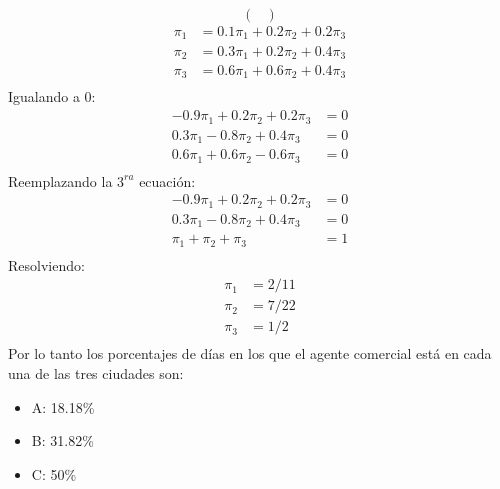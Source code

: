 \documentclass{templateNote}
\begin{document}
\begin{enumerate}
\begin{enumerate}[label=\alph*)]
\begin{equation*}
\begin{pmatrix}
            \end{pmatrix}
        \end{equation*}
        \begin{align*}
            \pi_1 &= 0.1\pi_1 + 0.2\pi_2 + 0.2\pi_3\\
            \pi_2 &= 0.3\pi_1 + 0.2\pi_2 + 0.4\pi_3\\
            \pi_3 &= 0.6\pi_1 + 0.6\pi_2 + 0.4\pi_3\\
        \end{align*}
        Igualando a 0:
        \begin{align*}
            -0.9\pi_1 + 0.2\pi_2 + 0.2\pi_3 &= 0\\
            0.3\pi_1 - 0.8\pi_2 + 0.4\pi_3 &= 0\\
            0.6\pi_1 + 0.6\pi_2 - 0.6\pi_3 &= 0\\
        \end{align*}
        Reemplazando la $3^{ra}$ ecuación:
        \begin{align*}
            -0.9\pi_1 + 0.2\pi_2 + 0.2\pi_3 &= 0\\
            0.3\pi_1 - 0.8\pi_2 + 0.4\pi_3 &= 0\\
            \pi_1 + \pi_2 + \pi_3 &= 1\\
        \end{align*}
        Resolviendo:
        \begin{align*}
            \pi_1 &= 2/11\\
            \pi_2 &= 7/22\\
            \pi_3 &= 1/2\\
        \end{align*}
        Por lo tanto los porcentajes de días en los que el agente comercial está en cada una de las tres ciudades son:
        \begin{itemize}
            \item A: 18.18\%
            \item B: 31.82\%
            \item C: 50\%
        \end{itemize}
    \end{enumerate}


\end{enumerate}
\end{document}
